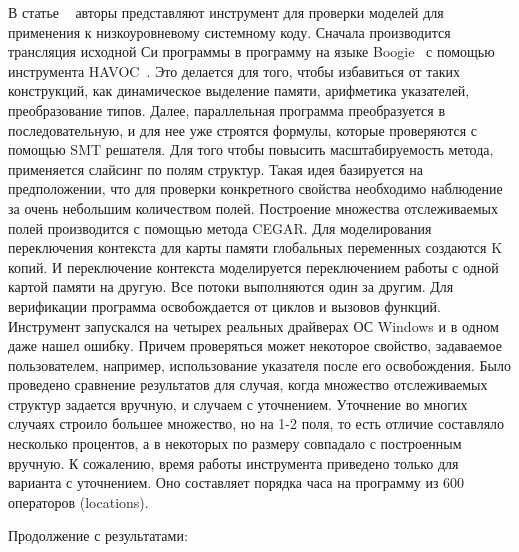 В статье ~\cite{Lahiri:2009} авторы представляют инструмент для проверки моделей для применения к низкоуровневому системному коду. Сначала производится трансляция исходной Си программы в программу на языке Boogie~\cite{boogiePL} с помощью инструмента HAVOC~\cite{Chatterjee:2007}.
Это делается для того, чтобы избавиться от таких конструкций, как динамическое выделение памяти, арифметика указателей, преобразование типов. Далее, параллельная программа преобразуется в последовательную, и для нее уже строятся формулы, которые проверяются с помощью SMT решателя.
Для того чтобы повысить масштабируемость метода, применяется слайсинг по полям структур.
Такая идея базируется на предположении, что для проверки конкретного свойства необходимо наблюдение за очень небольшим количеством полей.
Построение множества отслеживаемых полей производится с помощью метода CEGAR. 
Для моделирования переключения контекста для карты памяти глобальных переменных создаются K копий. И переключение контекста моделируется переключением работы с одной картой памяти на другую. Все потоки выполняются один за другим. 
Для верификации программа освобождается от циклов и вызовов функций.
Инструмент запускался на четырех реальных драйверах ОС Windows и в одном даже нашел ошибку. Причем проверяться может некоторое свойство, задаваемое пользователем, например, использование указателя после его освобождения. Было проведено сравнение результатов для случая, когда множество отслеживаемых структур задается вручную, и случаем с уточнением. Уточнение во многих случаях строило большее множество, но на 1-2 поля, то есть отличие составляло несколько процентов, а в некоторых по размеру совпадало с построенным вручную. К сожалению, время работы инструмента приведено только для варианта с уточнением. Оно составляет порядка часа на программу из 600 операторов (locations). 

Продолжение с результатами: ~\cite{Ghafari:2010}

